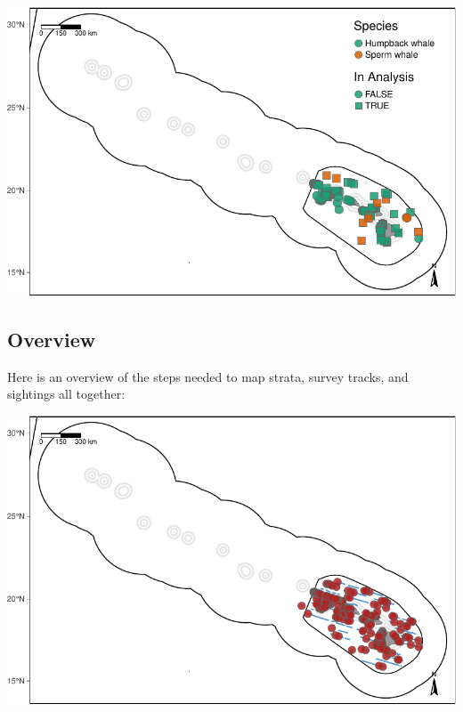 \documentclass[
]{book}
\newenvironment{Shaded}{\begin{snugshade}}{\end{snugshade}}
\newcommand{\DataTypeTok}[1]{\textcolor[rgb]{0.13,0.29,0.53}{#1}}
\newcommand{\DecValTok}[1]{\textcolor[rgb]{0.00,0.00,0.81}{#1}}
\newcommand{\KeywordTok}[1]{\textcolor[rgb]{0.13,0.29,0.53}{\textbf{#1}}}
\newcommand{\NormalTok}[1]{#1}
\newcommand{\OperatorTok}[1]{\textcolor[rgb]{0.81,0.36,0.00}{\textbf{#1}}}
\newcommand{\StringTok}[1]{\textcolor[rgb]{0.31,0.60,0.02}{#1}}
\begin{document}
\includegraphics{figures/unnamed-chunk-59-1.pdf}

\hypertarget{overview}{%
\subsection*{Overview}\label{overview}}

Here is an overview of the steps needed to map strata, survey tracks, and sightings all together:

\begin{Shaded}
\end{Shaded}

\includegraphics{figures/unnamed-chunk-60-1.pdf}
\end{document}
